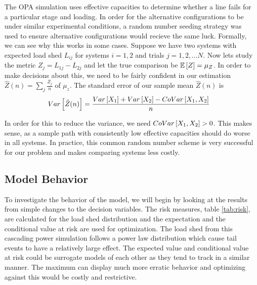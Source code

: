 The OPA simulation uses effective capacities to determine whether a line fails for a particular stage and loading.  In order for the alternative configurations to be under similar experimental conditions, a random number seeding strategy was used to ensure alternative configurations would recieve the same luck.  Formally, we can see why this works in some cases.  Suppose we have two systems with expected load shed $L_{ij}$ for systems $i=1,2$ and trials $j=1,2,...N$.  Now lets study the metric $Z_j = L_{1j} - L_{2j}$ and let the true comparison be $\mathbb{E}\left[ Z \right]=\mu_Z$.  In order to make decisions about this, we need to be fairly confident in our estimation $\hat{Z}(n)=\sum_j \frac{Z_j}{n}$ of $\mu_z$.  The standard error of our sample mean $\hat{Z}(n)$ is
\begin{equation}
Var\left[  \hat{Z}(n)  \right] = \frac{ Var\left[ X_1 \right] + Var\left[ X_2 \right] - CoVar\left[ X_1, X_2 \right] }{n}
\end{equation}

In order for this to reduce the variance, we need $CoVar\left[ X_1, X_2 \right]>0$.  This makes sense, as a sample path with consistently low effective capacities should do worse in all systems.  In practice, this common random number scheme is very successful for our problem and makes comparing systems less costly.


\subsection{Model Behavior}
To investigate the behavior of the model, we will begin by looking at the results from simple changes to the decision variables.  The risk measures, table \ref{tab:risk}, are calculated for the load shed distribution and the expectation and the conditional value at risk are used for optimization.  The load shed from this cascading power simulation follows a power law distribution which cause tail events to have a relatively large effect.  The expected value and conditional value at risk could be surrogate models of each other as they tend to track in a similar manner. The maximum can display much more erratic behavior and optimizing against this would be costly and restrictive.


